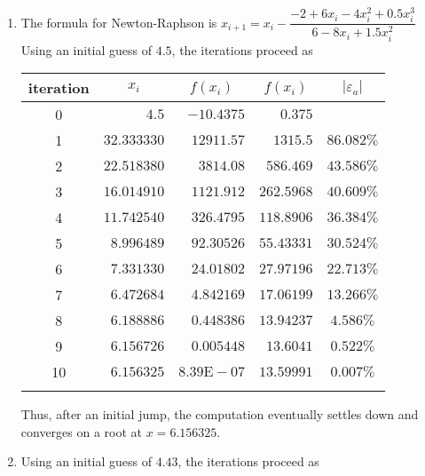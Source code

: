\documentclass[../main.tex]{subfiles}
\begin{document}
\section{}
\begin{enumerate}[label=\bfseries(\alph*)]
\item The formula for Newton-Raphson is
\bigbreak
$x_{i+1}=x_{i}-\dfrac{-2+6 x_{i}-4 x_{i}^{2}+0.5 x_{i}^{3}}{6-8 x_{i}+1.5 x_{i}^{2}}$
\bigbreak
Using an initial guess of $4.5$, the iterations proceed as
\bigbreak
\begin{tabular}{crrrc}
\Xhline{1.5pt}
iteration & \multicolumn{1}{c}{$x_{i}$} & \multicolumn{1}{c}{$f\left(x_{i}\right)$} & \multicolumn{1}{c}{$f\left(x_{i}\right)$} & $\left|\varepsilon_{a}\right|$ \\
\hline
0 & $4.5$ & $-10.4375$ & $0.375$ &  \\
1 & $32.333330$ & $12911.57$ & $1315.5$ & $86.082 \%$ \\
2 & $22.518380$ & $3814.08$ & $586.469$ & $43.586 \%$ \\
3 & $16.014910$ & $1121.912$ & $262.5968$ & $40.609 \%$ \\
4 & $11.742540$ & $326.4795$ & $118.8906$ & $36.384 \%$ \\
5 & $8.996489$ & $92.30526$ & $55.43331$ & $30.524 \%$ \\
6 & $7.331330$ & $24.01802$ & $27.97196$ & $22.713 \%$ \\
7 & $6.472684$ & $4.842169$ & $17.06199$ & $13.266 \%$ \\
8 & $6.188886$ & $0.448386$ & $13.94237$ & $4.586 \%$ \\
9 & $6.156726$ & $0.005448$ & $13.6041$ & $0.522 \%$ \\
10 & $6.156325$ & $8.39 \mathrm{E}-07$ & $13.59991$ & $0.007 \%$ \\
\Xhline{1.5pt}
\end{tabular}
\bigbreak
Thus, after an initial jump, the computation eventually settles down and converges on a root at $x=6.156325$.
\bigbreak
\item Using an initial guess of $4.43$, the iterations proceed as
\bigbreak


\end{enumerate}
\end{document}
